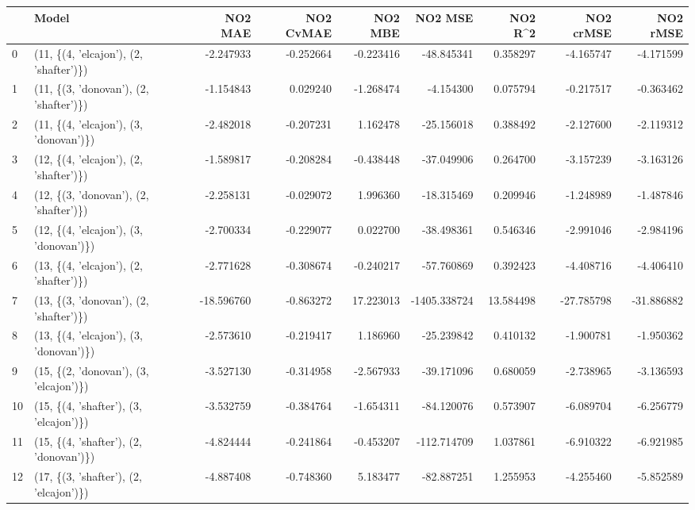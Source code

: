 \begin{tabular}{llrrrrrrr}
\toprule
{} &                                   Model &    NO2 MAE &  NO2 CvMAE &    NO2 MBE &      NO2 MSE &    NO2 R\textasciicircum2 &  NO2 crMSE &   NO2 rMSE \\
\midrule
0  &  (11, \{(4, 'elcajon'), (2, 'shafter')\}) &  -2.247933 &  -0.252664 &  -0.223416 &   -48.845341 &   0.358297 &  -4.165747 &  -4.171599 \\
1  &  (11, \{(3, 'donovan'), (2, 'shafter')\}) &  -1.154843 &   0.029240 &  -1.268474 &    -4.154300 &   0.075794 &  -0.217517 &  -0.363462 \\
2  &  (11, \{(4, 'elcajon'), (3, 'donovan')\}) &  -2.482018 &  -0.207231 &   1.162478 &   -25.156018 &   0.388492 &  -2.127600 &  -2.119312 \\
3  &  (12, \{(4, 'elcajon'), (2, 'shafter')\}) &  -1.589817 &  -0.208284 &  -0.438448 &   -37.049906 &   0.264700 &  -3.157239 &  -3.163126 \\
4  &  (12, \{(3, 'donovan'), (2, 'shafter')\}) &  -2.258131 &  -0.029072 &   1.996360 &   -18.315469 &   0.209946 &  -1.248989 &  -1.487846 \\
5  &  (12, \{(4, 'elcajon'), (3, 'donovan')\}) &  -2.700334 &  -0.229077 &   0.022700 &   -38.498361 &   0.546346 &  -2.991046 &  -2.984196 \\
6  &  (13, \{(4, 'elcajon'), (2, 'shafter')\}) &  -2.771628 &  -0.308674 &  -0.240217 &   -57.760869 &   0.392423 &  -4.408716 &  -4.406410 \\
7  &  (13, \{(3, 'donovan'), (2, 'shafter')\}) & -18.596760 &  -0.863272 &  17.223013 & -1405.338724 &  13.584498 & -27.785798 & -31.886882 \\
8  &  (13, \{(4, 'elcajon'), (3, 'donovan')\}) &  -2.573610 &  -0.219417 &   1.186960 &   -25.239842 &   0.410132 &  -1.900781 &  -1.950362 \\
9  &  (15, \{(2, 'donovan'), (3, 'elcajon')\}) &  -3.527130 &  -0.314958 &  -2.567933 &   -39.171096 &   0.680059 &  -2.738965 &  -3.136593 \\
10 &  (15, \{(4, 'shafter'), (3, 'elcajon')\}) &  -3.532759 &  -0.384764 &  -1.654311 &   -84.120076 &   0.573907 &  -6.089704 &  -6.256779 \\
11 &  (15, \{(4, 'shafter'), (2, 'donovan')\}) &  -4.824444 &  -0.241864 &  -0.453207 &  -112.714709 &   1.037861 &  -6.910322 &  -6.921985 \\
12 &  (17, \{(3, 'shafter'), (2, 'elcajon')\}) &  -4.887408 &  -0.748360 &   5.183477 &   -82.887251 &   1.255953 &  -4.255460 &  -5.852589 \\

\end{tabular}
